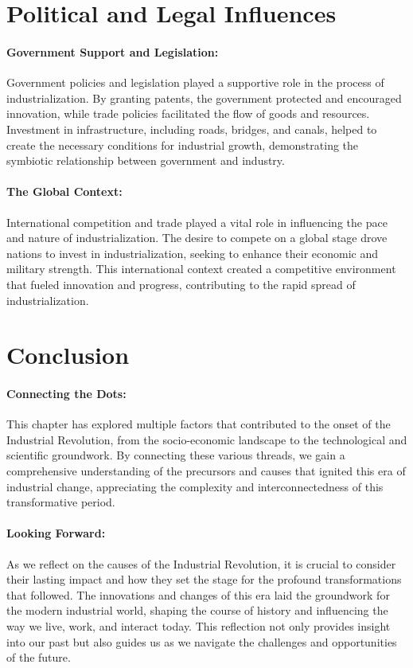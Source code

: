 \documentclass{book}
\begin{document}
\section*{Political and Legal Influences}

\paragraph{Government Support and Legislation:}
Government policies and legislation played a supportive role in the process of industrialization. By granting patents, the government protected and encouraged innovation, while trade policies facilitated the flow of goods and resources. Investment in infrastructure, including roads, bridges, and canals, helped to create the necessary conditions for industrial growth, demonstrating the symbiotic relationship between government and industry.

\paragraph{The Global Context:}
International competition and trade played a vital role in influencing the pace and nature of industrialization. The desire to compete on a global stage drove nations to invest in industrialization, seeking to enhance their economic and military strength. This international context created a competitive environment that fueled innovation and progress, contributing to the rapid spread of industrialization.

\section*{Conclusion}

\paragraph{Connecting the Dots:}
This chapter has explored multiple factors that contributed to the onset of the Industrial Revolution, from the socio-economic landscape to the technological and scientific groundwork. By connecting these various threads, we gain a comprehensive understanding of the precursors and causes that ignited this era of industrial change, appreciating the complexity and interconnectedness of this transformative period.

\paragraph{Looking Forward:}
As we reflect on the causes of the Industrial Revolution, it is crucial to consider their lasting impact and how they set the stage for the profound transformations that followed. The innovations and changes of this era laid the groundwork for the modern industrial world, shaping the course of history and influencing the way we live, work, and interact today. This reflection not only provides insight into our past but also guides us as we navigate the challenges and opportunities of the future.
\end{document}
